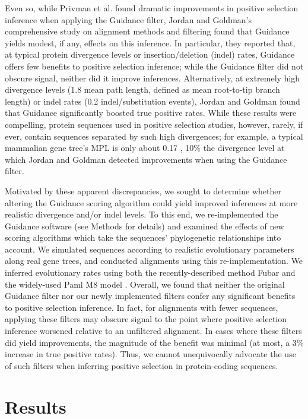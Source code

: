 \documentclass[10pt]{article}
\begin{document}
Even so, while Privman et al. \citep{Privman2012} found dramatic improvements in positive selection inference when applying the Guidance filter, Jordan and Goldman's \citep{Jordan2011} comprehensive study on alignment methods and filtering found that Guidance yields modest, if any, effects on this inference. In particular, they reported that, at typical protein divergence levels or insertion/deletion (indel) rates, Guidance offers few benefits to positive selection inference; while the Guidance filter did not obscure signal, neither did it improve inferences. Alternatively, at extremely high divergence levels (1.8 mean path length, defined as mean root-to-tip branch length) or indel rates (0.2 indel/substitution events), Jordan and Goldman found that Guidance significantly boosted true positive rates. While these results were compelling, protein sequences used in positive selection studies, however, rarely, if ever, contain sequences separated by such high divergences; for example, a typical mammalian gene tree's MPL is only about 0.17 \citep{Spielman2013}, 10\% the divergence level at which Jordan and Goldman detected improvements when using the Guidance filter.

Motivated by these apparent discrepancies, we sought to determine whether altering the Guidance scoring algorithm could yield improved inferences at more realistic divergence and/or indel levels. To this end, we re-implemented the Guidance software (see Methods for details) and examined the effects of new scoring algorithms which take the sequences' phylogenetic relationships into account. We simulated sequences according to realistic evolutionary parameters along real gene trees, and conducted alignments using this re-implementation. We inferred evolutionary rates using both the recently-described method Fubar \citep{Murrell2013} and the widely-used Paml M8 model \citep{Yang2007}. Overall, we found that neither the original Guidance filter nor our newly implemented filters confer any significant benefits to positive selection inference. In fact, for alignments with fewer sequences, applying these filters may obscure signal to the point where positive selection inference worsened relative to an unfiltered alignment. In cases where these filters did yield improvements, the magnitude of the benefit was minimal (at most, a 3\% increase in true positive rates). Thus, we cannot unequivocally advocate the use of such filters when inferring positive selection in protein-coding sequences.


\section*{Results}
\end{document}
